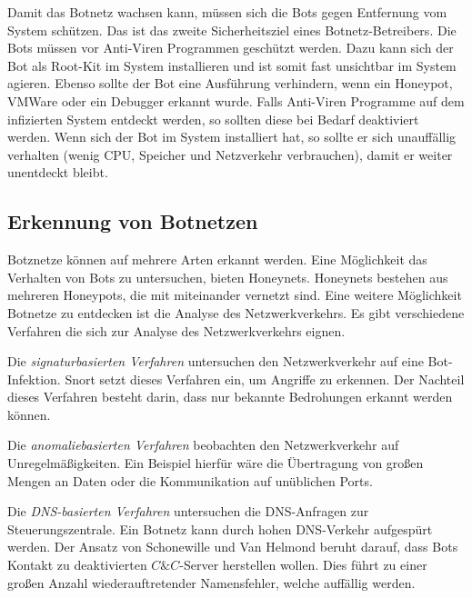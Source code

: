 Damit das Botnetz wachsen kann, müssen sich die Bots gegen Entfernung
vom System schützen. Das ist das zweite Sicherheitsziel eines Botnetz-Betreibers.
Die Bots müssen vor Anti-Viren Programmen geschützt werden. Dazu kann sich
der Bot als Root-Kit im System installieren und ist somit fast unsichtbar im System agieren.
Ebenso sollte der Bot eine Ausführung verhindern, wenn ein Honeypot, VMWare 
oder ein Debugger erkannt wurde. Falls Anti-Viren Programme auf dem infizierten
System entdeckt werden, so sollten diese bei Bedarf deaktiviert werden. Wenn sich
der Bot im System installiert hat, so sollte er sich unauffällig verhalten
(wenig CPU, Speicher und Netzverkehr verbrauchen), damit er weiter unentdeckt
bleibt.

\subsection{Erkennung von Botnetzen}
Botznetze können auf mehrere Arten erkannt werden. Eine Möglichkeit das Verhalten
von Bots zu untersuchen, bieten Honeynets. Honeynets bestehen aus mehreren Honeypots,
die mit miteinander vernetzt sind. Eine weitere Möglichkeit Botnetze zu entdecken
ist die Analyse des Netzwerkverkehrs. Es gibt verschiedene Verfahren die sich zur 
Analyse des Netzwerkverkehrs eignen. 

Die \emph{signaturbasierten Verfahren} untersuchen den Netzwerkverkehr auf eine 
Bot-Infektion. Snort setzt dieses Verfahren ein, um Angriffe zu erkennen.
Der Nachteil dieses Verfahren besteht darin, dass nur bekannte Bedrohungen erkannt
werden können. 

Die \emph{anomaliebasierten Verfahren} beobachten den Netzwerkverkehr auf
Unregelmäßigkeiten. Ein Beispiel hierfür wäre die Übertragung von großen
Mengen an Daten oder die Kommunikation auf unüblichen Ports.

Die \emph{DNS-basierten Verfahren} untersuchen die DNS-Anfragen zur 
Steuerungszentrale. Ein Botnetz kann durch hohen DNS-Verkehr aufgespürt werden.
Der Ansatz von Schonewille und Van Helmond beruht darauf, dass Bots Kontakt zu
deaktivierten $C \& C$-Server herstellen wollen. Dies führt zu einer großen Anzahl
wiederauftretender Namensfehler, welche auffällig werden.

